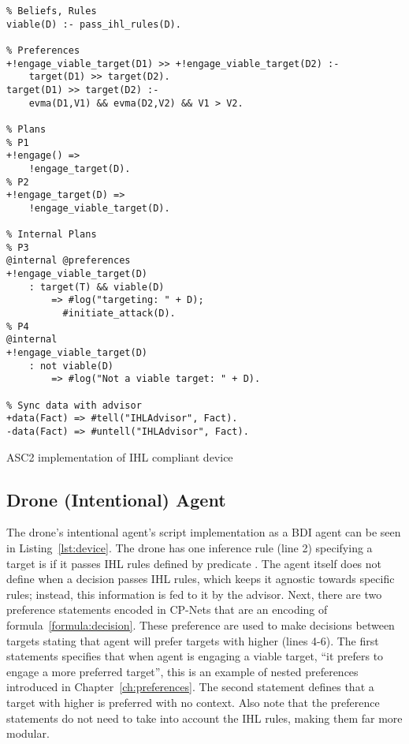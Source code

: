 

\begin{listing}
\centering
\begin{tcolorbox}[left=2pt,right=2pt,top=2pt,bottom=2pt,arc=0pt,
                  boxrule=0pt,toprule=1pt,
                  colback=white]
\begin{verbatim}
% Beliefs, Rules
viable(D) :- pass_ihl_rules(D).

% Preferences
+!engage_viable_target(D1) >> +!engage_viable_target(D2) :-
    target(D1) >> target(D2).
target(D1) >> target(D2) :- 
    evma(D1,V1) && evma(D2,V2) && V1 > V2.

% Plans
% P1
+!engage() =>
    !engage_target(D).
% P2
+!engage_target(D) =>
    !engage_viable_target(D).

% Internal Plans
% P3
@internal @preferences
+!engage_viable_target(D)
    : target(T) && viable(D)
        => #log("targeting: " + D);
          #initiate_attack(D).
% P4
@internal
+!engage_viable_target(D)
    : not viable(D)
        => #log("Not a viable target: " + D).

% Sync data with advisor
+data(Fact) => #tell("IHLAdvisor", Fact).
-data(Fact) => #untell("IHLAdvisor", Fact).
\end{verbatim}
\end{tcolorbox}
\caption{ASC2 implementation of IHL compliant device}
\label{lst:device}
\end{listing}


\subsection{Drone (Intentional) Agent}
The drone's intentional agent's script implementation as a BDI agent can be seen in Listing~\ref{lst:device}. The drone has one inference rule (line 2) specifying a target is  if it passes IHL rules defined by predicate . The agent itself does not define when a decision passes IHL rules, which keeps it agnostic towards specific rules; instead, this information is fed to it by the advisor. Next, there are two preference statements encoded in CP-Nets that are an encoding of formula~\ref{formula:decision}. These preference are used to make decisions between targets stating that agent will prefer targets with higher  (lines 4-6). The first statements specifies that when agent is engaging a viable target, ``it prefers to engage a more preferred target'', this is an example of nested preferences introduced in Chapter~\ref{ch:preferences}. The second statement defines that a target with higher  is preferred with no context. Also note that the preference statements do not need to take into account the IHL rules, making them far more modular. 

